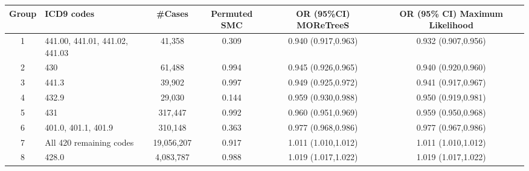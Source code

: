 \begin{tabular}{cp{6cm}cccc}
  \hline
Group & ICD9 codes & \#Cases & Permuted SMC & OR (95\%CI) MOReTreeS & OR (95\% CI) Maximum Likelihood \\ 
  \hline
1 & 441.00, 441.01, 441.02, 441.03 & 41,358 & 0.309 & 0.940 (0.917,0.963) & 0.932 (0.907,0.956) \\ 
  2 & 430 & 61,488 & 0.994 & 0.945 (0.926,0.965) & 0.940 (0.920,0.960) \\ 
  3 & 441.3 & 39,902 & 0.997 & 0.949 (0.925,0.972) & 0.941 (0.917,0.967) \\ 
  4 & 432.9 & 29,030 & 0.144 & 0.959 (0.930,0.988) & 0.950 (0.919,0.981) \\ 
  5 & 431 & 317,447 & 0.992 & 0.960 (0.951,0.969) & 0.959 (0.950,0.968) \\ 
  6 & 401.0, 401.1, 401.9 & 310,148 & 0.363 & 0.977 (0.968,0.986) & 0.977 (0.967,0.986) \\ 
  7 & All 420 remaining codes & 19,056,207 & 0.917 & 1.011 (1.010,1.012) & 1.011 (1.010,1.012) \\ 
  8 & 428.0 & 4,083,787 & 0.988 & 1.019 (1.017,1.022) & 1.019 (1.017,1.022) \\ 
   \hline
\end{tabular}

